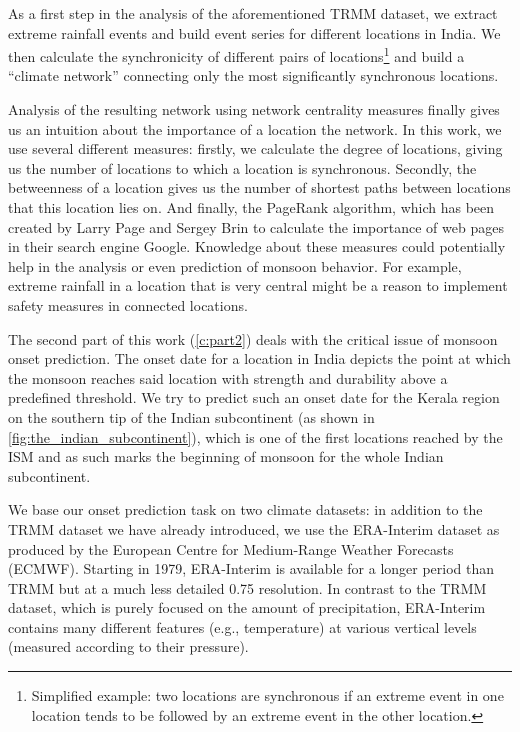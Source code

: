 As a first step in the analysis of the aforementioned TRMM dataset, we extract extreme rainfall events and build event series for different locations in India. We then calculate the synchronicity of different pairs of locations\footnote{Simplified example: two locations are synchronous if an extreme event in one location tends to be followed by an extreme event in the other location.} and build a ``climate network'' connecting only the most significantly synchronous locations.

Analysis of the resulting network using network centrality measures finally gives us an intuition about the importance of a location the network. In this work, we use several different measures: firstly, we calculate the degree of locations, giving us the number of locations to which a location is synchronous. Secondly, the betweenness of a location gives us the number of shortest paths between locations that this location lies on. And finally, the PageRank algorithm, which has been created by Larry Page and Sergey Brin to calculate the importance of web pages in their search engine Google. Knowledge about these measures could potentially help in the analysis or even prediction of monsoon behavior. For example, extreme rainfall in a location that is very central might be a reason to implement safety measures in connected locations.

The second part of this work (\cref{c:part2}) deals with the critical issue of monsoon onset prediction. The onset date for a location in India depicts the point at which the monsoon reaches said location with strength and durability above a predefined threshold. We try to predict such an onset date for the Kerala region on the southern tip of the Indian subcontinent (as shown in \cref{fig:the_indian_subcontinent}), which is one of the first locations reached by the ISM and as such marks the beginning of monsoon for the whole Indian subcontinent.

We base our onset prediction task on two climate datasets: in addition to the TRMM dataset we have already introduced, we use the ERA-Interim dataset as produced by the European Centre for Medium-Range Weather Forecasts (ECMWF). Starting in 1979, ERA-Interim is available for a longer period than TRMM but at a much less detailed {0.75\degree} resolution. In contrast to the TRMM dataset, which is purely focused on the amount of precipitation, ERA-Interim contains many different features (e.g., temperature) at various vertical levels (measured according to their pressure).

